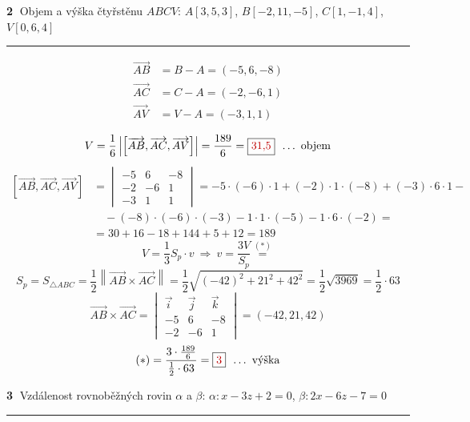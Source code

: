 \documentclass[11pt,a4paper]{article}
\newcommand{\vysl}[1]{\boxed{\color{red!75!black}#1}}
\newcommand{\vv}[1]{\overrightarrow{#1}}
\newcommand{\norm}[1]{\left\|#1\right\|}
\begin{document}
\bigskip
\textbf{\textcircled{2}} Objem a výška čtyřstěnu $ABCV$: \quad $A[3,5,3]$, $B[-2,11,-5]$, $C[1,-1,4]$, $V[0,6,4]$
\hrule
\medskip

\begin{minipage}{0.3\textwidth}
\end{minipage}%
\begin{minipage}{0.65\textwidth}
\begin{align*}
\vv{AB} &= B-A = (-5,6,-8)\\
\vv{AC} &= C-A = (-2,-6,1)\\
\vv{AV} &= V-A = (-3,1,1)
\end{align*}
\end{minipage}

\[
V=\frac16\left|\left[\vv{AB},\vv{AC},\vv{AV}\right]\right| = \frac{189}{6} = \vysl{31{,}5}\ \ \text{\ldots\ objem}
\]
\begin{align*}
\left[\vv{AB},\vv{AC},\vv{AV}\right] &= \begin{vmatrix} -5 & 6 & -8\\ -2 & -6 & 1\\ -3 & 1 & 1 \end{vmatrix}
= -5\cdot(-6)\cdot1+(-2)\cdot1\cdot(-8)+(-3)\cdot6\cdot1-\\
&\quad-(-8)\cdot(-6)\cdot(-3)-1\cdot1\cdot(-5)-1\cdot6\cdot(-2) =\\
&= 30+16-18+144+5+12 = 189
\end{align*}
\[
V=\frac13S_p\cdot v \ \Rightarrow\ v=\frac{3V}{S_p} \overset{(*)}{=}
\]
\[
S_p=S_{\triangle ABC}=\frac12\norm{\vv{AB}\times\vv{AC}}=\frac12\sqrt{(-42)^2+21^2+42^2}=\frac12\sqrt{3969}=\frac12\cdot63
\]
\[
\vv{AB}\times\vv{AC} = \begin{vmatrix} \vec i & \vec j & \vec k\\ -5 & 6 & -8\\ -2 & -6 & 1 \end{vmatrix} = (-42,21,42)
\]
\[
(*) = \frac{3\cdot\frac{189}{6}}{\frac12\cdot63} = \vysl{3}\ \ \text{\ldots\ výška}
\]

\bigskip
\textbf{\textcircled{3}} Vzdálenost rovnoběžných rovin $\alpha$ a $\beta$: \quad $\alpha\colon x-3z+2=0$, \quad $\beta\colon 2x-6z-7=0$
\hrule
\medskip
\end{document}

